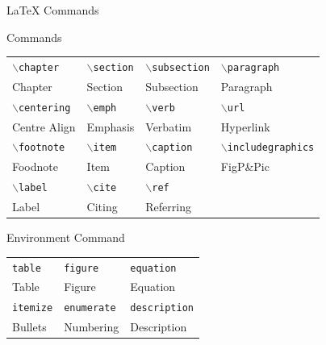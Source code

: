 \documentclass{beamer}
\def\cmd#1{\texttt{\color{red}\footnotesize $\backslash$#1}}
\def\env#1{\texttt{\color{blue}\footnotesize #1}}
\begin{document}
\begin{frame}[fragile]{\LaTeX{} Commands}
    \begin{exampleblock}{Commands}
        \centering
        \footnotesize
        \begin{tabular}{llll}
            \cmd{chapter} & \cmd{section} & \cmd{subsection} & \cmd{paragraph} \\
            Chapter & Section & Subsection & Paragraph \\\hline
            \cmd{centering} & \cmd{emph} & \cmd{verb} & \cmd{url} \\
            Centre Align & Emphasis & Verbatim & Hyperlink \\\hline
            \cmd{footnote} & \cmd{item} & \cmd{caption} & \cmd{includegraphics} \\
            Foodnote & Item & Caption & FigP\&Pic \\\hline
            \cmd{label} & \cmd{cite} & \cmd{ref} \\
            Label & Citing & Referring\\\hline
        \end{tabular}
    \end{exampleblock}
    \begin{exampleblock}{Environment Command}
        \centering
        \footnotesize
        \begin{tabular}{lll}
            \env{table} & \env{figure} & \env{equation}\\
            Table & Figure & Equation \\\hline
            \env{itemize} & \env{enumerate} & \env{description}\\
            Bullets & Numbering & Description \\\hline
        \end{tabular}
    \end{exampleblock}
\end{frame}
\end{document}
